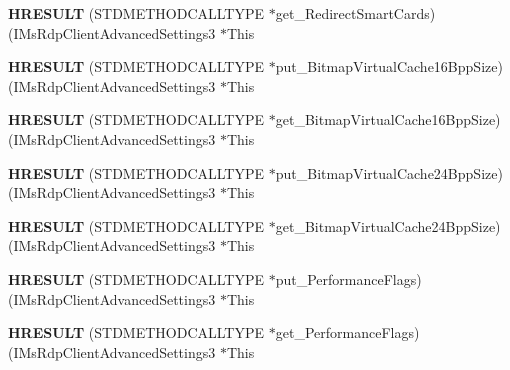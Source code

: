 \begin{DoxyCompactItemize}
{\bfseries H\+R\+E\+S\+U\+LT} (S\+T\+D\+M\+E\+T\+H\+O\+D\+C\+A\+L\+L\+T\+Y\+PE $\ast$get\+\_\+\+Redirect\+Smart\+Cards)(I\+Ms\+Rdp\+Client\+Advanced\+Settings3 $\ast$This
\item 
\mbox{\label{struct_i_ms_rdp_client_advanced_settings3_vtbl_abf04e3175af2f339da0c0bceabc2617d}} 
{\bfseries H\+R\+E\+S\+U\+LT} (S\+T\+D\+M\+E\+T\+H\+O\+D\+C\+A\+L\+L\+T\+Y\+PE $\ast$put\+\_\+\+Bitmap\+Virtual\+Cache16\+Bpp\+Size)(I\+Ms\+Rdp\+Client\+Advanced\+Settings3 $\ast$This
\item 
\mbox{\label{struct_i_ms_rdp_client_advanced_settings3_vtbl_ab5bea436cc8dfb45525b04ea17c6b710}} 
{\bfseries H\+R\+E\+S\+U\+LT} (S\+T\+D\+M\+E\+T\+H\+O\+D\+C\+A\+L\+L\+T\+Y\+PE $\ast$get\+\_\+\+Bitmap\+Virtual\+Cache16\+Bpp\+Size)(I\+Ms\+Rdp\+Client\+Advanced\+Settings3 $\ast$This
\item 
\mbox{\label{struct_i_ms_rdp_client_advanced_settings3_vtbl_a6106e758b0d4bb905b5a0c7752237536}} 
{\bfseries H\+R\+E\+S\+U\+LT} (S\+T\+D\+M\+E\+T\+H\+O\+D\+C\+A\+L\+L\+T\+Y\+PE $\ast$put\+\_\+\+Bitmap\+Virtual\+Cache24\+Bpp\+Size)(I\+Ms\+Rdp\+Client\+Advanced\+Settings3 $\ast$This
\item 
\mbox{\label{struct_i_ms_rdp_client_advanced_settings3_vtbl_a59f5044571d1b0a990af43f79119cde2}} 
{\bfseries H\+R\+E\+S\+U\+LT} (S\+T\+D\+M\+E\+T\+H\+O\+D\+C\+A\+L\+L\+T\+Y\+PE $\ast$get\+\_\+\+Bitmap\+Virtual\+Cache24\+Bpp\+Size)(I\+Ms\+Rdp\+Client\+Advanced\+Settings3 $\ast$This
\item 
\mbox{\label{struct_i_ms_rdp_client_advanced_settings3_vtbl_a62cda8dce52b39471500cece01ddea9e}} 
{\bfseries H\+R\+E\+S\+U\+LT} (S\+T\+D\+M\+E\+T\+H\+O\+D\+C\+A\+L\+L\+T\+Y\+PE $\ast$put\+\_\+\+Performance\+Flags)(I\+Ms\+Rdp\+Client\+Advanced\+Settings3 $\ast$This
\item 
\mbox{\label{struct_i_ms_rdp_client_advanced_settings3_vtbl_a12c3989b30e52c085f5e90bb4e229444}} 
{\bfseries H\+R\+E\+S\+U\+LT} (S\+T\+D\+M\+E\+T\+H\+O\+D\+C\+A\+L\+L\+T\+Y\+PE $\ast$get\+\_\+\+Performance\+Flags)(I\+Ms\+Rdp\+Client\+Advanced\+Settings3 $\ast$This

\end{DoxyCompactItemize}
